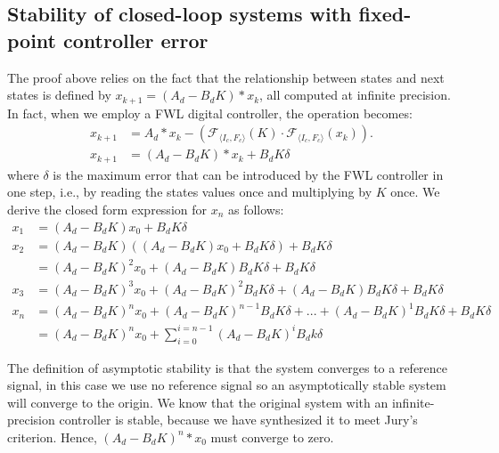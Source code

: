 \documentclass[runningheads,a4paper]{llncs}
\begin{document}
\subsection{Stability of closed-loop systems with fixed-point controller error}

The proof above relies on the fact that the relationship between states and next states is defined by
$x_{k+1} = (A_d  - B_dK)*x_k$, all computed at infinite precision. In fact, when we employ a FWL digital controller, 
the operation becomes:
\begin{align*}
x_{k+1} &= A_d * x_{k} -(\mathcal{F}_{\langle I_c,F_c \rangle}(K)\cdot\mathcal{F}_{\langle I_c,F_c \rangle}(x_{k})).  \\
x_{k+1} &= (A_d  - B_dK)*x_k + B_dK\delta
\end{align*}
where $\delta$ is the maximum error that can be introduced by the FWL controller in one step, i.e., by reading the states values once and multiplying by $K$ once. 
We derive the closed form expression for $x_n$ as follows: 
\begin{align*}
x_{1} &= (A_d  - B_dK)x_0 + B_dK\delta \\
x_{2} &= (A_d  - B_dK)((A_d  - B_dK)x_0 + B_dK\delta ) + B_dK\delta \\
      &=(A_d  - B_dK)^2x_0 + (A_d  - B_dK)B_dK\delta + B_dK\delta \\
x_{3}  &=(A_d  - B_dK)^3x_0 + (A_d  - B_dK)^2B_dK\delta + (A_d  - B_dK)B_dK\delta + B_dK\delta\\
x_{n} &= (A_d  - B_dK)^nx_0 + (A_d  - B_dK)^{n-1}B_dK\delta + ... + (A_d  - B_dK)^1B_dK \delta + B_dK\delta \\
  &= (A_d - B_dK)^nx_0 + \sum_{i=0}^{i=n-1}(A_d - B_dK)^iB_dk\delta
\end{align*}

The definition of asymptotic stability is that the system converges to a reference signal, in this case we use no
reference signal so an asymptotically stable system will converge to the origin. We know that the original system
with an infinite-precision controller is stable, because we have synthesized it to meet Jury's criterion. Hence, 
$(A_d  - B_dK)^n*x_0$ must converge to zero. 
\end{document}
